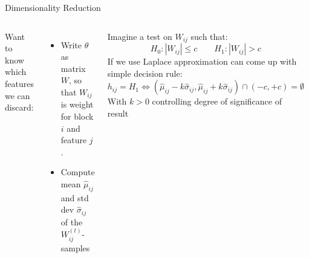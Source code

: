 \documentclass{beamer}
\begin{document}
	\begin{frame}{Dimensionality Reduction}
		\begin{columns}
			Want to know which features we can discard:
			\begin{itemize}
				\item Write $\theta$ as matrix $W$, so that $W_{ij}$ is weight for block $i$ and feature $j$.
				\item Compute mean $\hat{\mu}_{ij}$ and std dev $\hat{\sigma}_{ij}$ of the $W_{ij}^{(t)}$-samples
			\end{itemize}
			Imagine a test on $W_{ij}$ such that:
			$$H_0: |W_{ij}| \leq c \qquad H_1: |W_{ij}| > c$$
			If we use Laplace approximation can come up with simple decision rule:
			$$h_{ij} = H_1 \iff \left(\hat{\mu}_{ij} - k \hat{\sigma}_{ij}, \hat{\mu}_{ij} + k \hat{\sigma}_{ij}\right)
			\cap (-c, +c) = \emptyset$$
			With $k>0$ controlling degree of significance of result
			\begin{figure}
				\includegraphics[width=\linewidth]{significance-test.png}
			\end{figure}
		\end{columns}		
	\end{frame}
\end{document}
